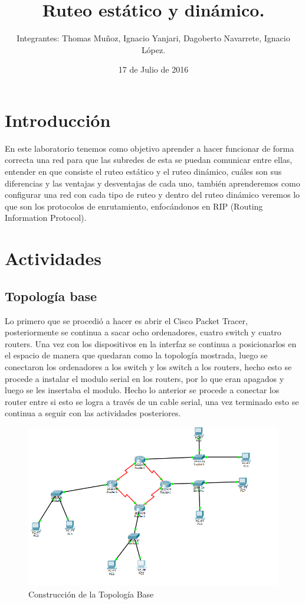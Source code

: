 \documentclass{udpreport}
\title{Ruteo estático y dinámico. }
\author{Integrantes: Thomas Muñoz, Ignacio Yanjari, Dagoberto Navarrete, Ignacio López.}
\date{17 de Julio de 2016}
\begin{document}
\maketitle
\tableofcontents
\listoffigures
\chapter{Introducción}
  En este laboratorio tenemos como objetivo aprender a hacer funcionar de forma correcta una red para que las subredes de esta se
  puedan comunicar entre ellas, entender en que consiste el ruteo estático y el ruteo dinámico, cuáles son sus diferencias y las
  ventajas y desventajas de cada uno, también aprenderemos como configurar una red con cada tipo de ruteo y dentro del ruteo dinámico
  veremos lo que son los protocolos de enrutamiento, enfocándonos en RIP (Routing Information Protocol).
\chapter{Actividades}
	\section{Topología base}
	Lo primero que se procedió a hacer es abrir el Cisco Packet Tracer, posteriormente se continua a sacar ocho ordenadores,
	cuatro switch y cuatro routers. Una vez con los dispositivos en la interfaz se continua a posicionarlos en el espacio de
	manera que quedaran como la topología mostrada, luego se conectaron los ordenadores a los switch y los switch a los
	routers, hecho esto se procede a instalar el modulo serial en los routers, por lo que eran apagados y luego se les insertaba
	el modulo. Hecho lo anterior se procede a conectar los router entre si esto se logra a través de un cable serial, una vez
	terminado esto se continua a seguir con las actividades posteriores.\\
	\begin{figure}[H]
	\centering
	\includegraphics[width=\textwidth]{Topologia_base.PNG}
	\caption{Construcción de la Topología Base}
	\end{figure}
	\newpage
\end{document}
